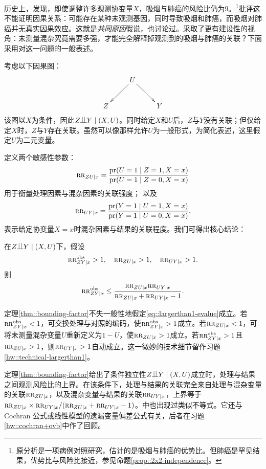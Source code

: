 历史上，\citet{doll1950smoking}发现，即使调整许多观测协变量$X$，吸烟与肺癌的风险比仍为$9$。\footnote{原分析是一项病例对照研究，估计的是吸烟与肺癌的优势比。但肺癌是罕见结果，优势比与风险比接近，参见命题\ref{prop::2x2-independence}。}\citet{Fisher::1957}批评这不能证明因果关系：可能存在某种未观测基因，同时导致吸烟和肺癌，而吸烟对肺癌并无真实因果效应。这就是{\it 共同原因}假说，\citet{reichenbach1991direction}也讨论过。\citet{Cornfield::1959}采取了更有建设性的视角：未测量混杂究竟需要多强，才能完全解释掉观测到的吸烟与肺癌的关联？下面采用\citet{ding2016sensitivity}对这一问题的一般表述。 


考虑以下因果图：
$$
\xymatrix{
 &U \ar[dl] \ar[dr] \\
 Z   && Y 
}
$$
该图以$X$为条件，因此$Z\ind Y\mid (X, U)$。同时给定$X$和$U$后，$Z$与$Y$没有关联；但仅给定$X$时，$Z$与$Y$存在关联。虽然可以像\citet{ding2016sensitivity}那样允许$U$为一般形式，为简化表述，这里假定$U$为二元变量。 


定义两个敏感性参数：
$$
\textsc{rr}_{ZU\mid x} = \frac{ \textup{pr}(U=1\mid Z=1,X=x) }{ \textup{pr}(U=1\mid Z=0,X=x)  } 
$$
用于衡量处理因素与混杂因素的关联强度；
以及
$$
\textsc{rr}_{UY\mid x} = \frac{  \textup{pr}(Y=1\mid U=1, X=x) }{  \textup{pr}(Y=1\mid U=0, X=x) },
$$
表示给定协变量$X=x$时混杂因素与结果的关联程度。我们可得出核心结论：

\begin{theorem}\label{thm::bounding-factor}
在$Z\ind Y\mid (X, U)$下，假设
\begin{equation}\label{eq::largerthan1-evalue}
\textsc{rr}_{ZY\mid x}^{\textup{obs}} > 1, \quad
 \textsc{rr}_{ZU\mid x} > 1,\quad 
 \textsc{rr}_{UY\mid x} > 1.
\end{equation}
则
$$
\textsc{rr}_{ZY\mid x}^{\textup{obs}} \leq \frac{ \textsc{rr}_{ZU\mid x}  \textsc{rr}_{UY\mid x} }{  \textsc{rr}_{ZU\mid x} + \textsc{rr}_{UY\mid x} - 1} .
$$
\end{theorem}

定理\ref{thm::bounding-factor}不失一般性地假定\eqref{eq::largerthan1-evalue}成立。若$\textsc{rr}_{ZY\mid x}^{\textup{obs}} < 1$，可交换处理与对照的编码，使$\textsc{rr}_{ZY\mid x}^{\textup{obs}} > 1$成立。若$  \textsc{rr}_{ZU\mid x}  < 1$，可将未测量混杂变量$U$重新定义为$1-U$，使$   \textsc{rr}_{ZU\mid x}  > 1$成立。若$\textsc{rr}_{ZY\mid x}^{\textup{obs}} > 1$且$ \textsc{rr}_{ZU\mid x} > 1$，则$ \textsc{rr}_{UY\mid x}  > 1$自动成立。这一微妙的技术细节留作习题\ref{hw::technical-largerthan1}。 


定理\ref{thm::bounding-factor}给出了条件独立性$Z\ind Y\mid (X, U)$成立时，处理与结果之间观测风险比的上界。在该条件下，处理与结果的关联完全来自处理与混杂变量的关联$\textsc{rr}_{ZU\mid x} $，以及混杂变量与结果的关联$\textsc{rr}_{UY\mid x}$，上界等于$\textsc{rr}_{ZU\mid x} \times  \textsc{rr}_{UY\mid x} /  (\textsc{rr}_{ZU\mid x} + \textsc{rr}_{UY\mid x} - 1)$。\citet{lee2011bounding}中也出现过类似不等式。它还与 Cochran 公式或线性模型的遗漏变量偏差公式有关，后者在习题\ref{hw::cochran+ovb}中作了回顾。  



